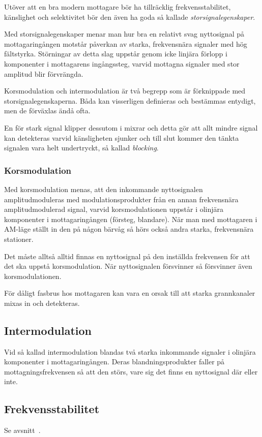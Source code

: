 Utöver att en bra modern mottagare bör ha tillräcklig frekvensstabilitet,
känslighet och selektivitet bör den även ha goda så kallade
\emph{storsignalegenskaper}.

Med storsignalegenskaper menar man hur bra en relativt svag nyttosignal på
mottagaringången motstår påverkan av starka, frekvensnära signaler med hög
fältstyrka.
Störningar av detta slag uppstår genom icke linjära förlopp i komponenter i
mottagarens ingångssteg, varvid mottagna signaler med stor amplitud blir
förvrängda.

Korsmodulation och intermodulation är två begrepp som är förknippade
med storsignalegenskaperna.
Båda kan visserligen definieras och bestämmas entydigt, men de förväxlas ändå
ofta.

En för stark signal klipper dessutom i mixrar och detta gör att allt mindre
signal kan detekteras varvid känsligheten sjunker och till slut kommer den
tänkta signalen vara helt undertryckt, så kallad \emph{blocking}.

\subsubsection{Korsmodulation}

Med korsmodulation menas, att den inkommande nyttosignalen amplitudmoduleras
med modulationsprodukter från en annan frekvensnära amplitudmodulerad signal,
varvid korsmodulationen uppstår i olinjära komponenter i mottagaringången
(försteg, blandare).
När man med mottagaren i AM-läge ställt in den på någon bärvåg så hörs också
andra starka, frekvensnära stationer.

Det måste alltså alltid finnas en nyttosignal på den inställda frekvensen för
att det ska uppstå korsmodulation.
När nyttosignalen försvinner så försvinner även korsmodulationen.

För dåligt fasbrus hos mottagaren kan vara en orsak till att starka
grannkanaler mixas in och detekteras.

\subsection{Intermodulation}

Vid så kallad intermodulation blandas två starka inkommande signaler i olinjära
komponenter i mottagaringången.
Deras blandningsprodukter faller på mottagningsfrekvensen så att den störs,
vare sig det finns en nyttosignal där eller inte.

\subsection{Frekvensstabilitet}

Se avsnitt~.
